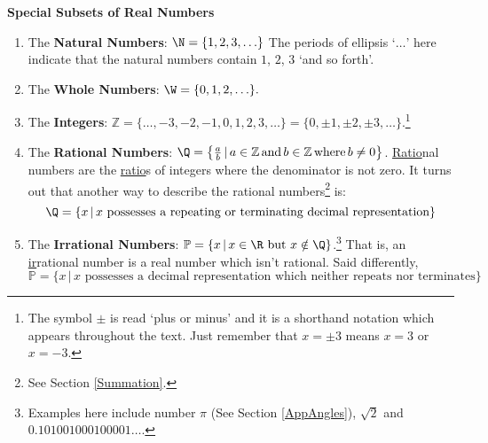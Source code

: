 \colorbox{ResultColor}{\bbm

\centerline{\textbf{Special Subsets of Real Numbers}}

\begin{enumerate}

\item The \textbf{Natural Numbers}: $\N= \{ 1, 2, 3,  \ldots\}$ The periods of ellipsis `$\ldots$' here indicate that the natural numbers contain $1$, $2$, $3$ `and so forth'.

\item The \textbf{Whole Numbers}: $\W = \{ 0, 1, 2, \ldots \}.$

\item The \textbf{Integers}: $\mathbb Z=\{ \ldots, -3, -2, -1, 0, 1, 2, 3, \ldots \} = \{ 0, \pm 1, \pm 2, \pm 3, \ldots\}.$\footnote{The symbol $\pm$ is read `plus or minus' and it is a shorthand notation which appears throughout the text.  Just remember that $x = \pm 3$ means $x = 3$ or $x = -3$.}

\item The \textbf{Rational Numbers}: $\Q=\left\{\frac{a}{b} \, | \, a \in \mathbb Z \, \mbox{and} \, b \in \mathbb Z \, \mbox{where} \, b \neq 0\right\}$.  \underline{Ratio}nal numbers are the \underline{ratio}s of integers where the denominator is not zero.  It turns out that another way to describe the rational numbers\footnote{See Section \ref{Summation}.} is: \[\Q=\{x\,|\,\mbox{$x$ possesses a repeating or terminating decimal representation}\}\]

\item The \textbf{Irrational Numbers}: $\mathbb P = \{x\,|\,\mbox{$x \in \R$ but $x \notin \Q$}\}$.\footnote{Examples here include number $\pi$ (See Section \ref{AppAngles}), $\sqrt{2}$ and $0.101001000100001\ldots$.}  That is, an \underline{ir}rational number is a real number which isn't rational.  Said differently, \[\mathbb P = \{x\,|\,\mbox{$x$ possesses a decimal representation which neither repeats nor terminates}\}\]

\end{enumerate}

\ebm}

